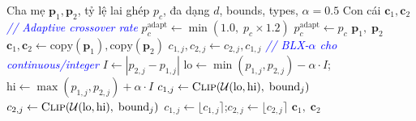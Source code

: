 \documentclass[12pt,a4paper]{article}
\begin{document}
\begin{algorithm}[H]
\caption{Lai ghép BLX-$\alpha$ chi tiết (\textsc{BLXAlphaCrossover})}
\label{alg:ga_crossover}
\begin{algorithmic}[1]
\Require Cha mẹ $\mathbf{p}_1, \mathbf{p}_2$, tỷ lệ lai ghép $p_c$, đa dạng $d$, bounds, types, $\alpha = 0.5$
\Ensure Con cái $\mathbf{c}_1, \mathbf{c}_2$
\Statex \textcolor{blue}{\textit{// Adaptive crossover rate}}
    \State $p_c^{\text{adapt}} \gets \min(1.0,\; p_c \times 1.2)$ 
\Else
    \State $p_c^{\text{adapt}} \gets p_c$
\EndIf
{}
    \State \Return $\mathbf{p}_1,\; \mathbf{p}_2$ 
\EndIf
\State $\mathbf{c}_1, \mathbf{c}_2 \gets \text{copy}(\mathbf{p}_1), \text{copy}(\mathbf{p}_2)$
            \State $c_{1,j}, c_{2,j} \gets c_{2,j}, c_{1,j}$ 
        \EndIf
    \Else
        \Statex \textcolor{blue}{\textit{\quad\quad// BLX-$\alpha$ cho continuous/integer}}
        \State $I \gets |p_{2,j} - p_{1,j}|$
        \State $\text{lo} \gets \min(p_{1,j}, p_{2,j}) - \alpha \cdot I$;\quad $\text{hi} \gets \max(p_{1,j}, p_{2,j}) + \alpha \cdot I$
        \State $c_{1,j} \gets \textsc{Clip}(\mathcal{U}(\text{lo}, \text{hi}),\; \text{bound}_j)$
        \State $c_{2,j} \gets \textsc{Clip}(\mathcal{U}(\text{lo}, \text{hi}),\; \text{bound}_j)$
            \State $c_{1,j} \gets \lfloor c_{1,j} \rceil$;\quad $c_{2,j} \gets \lfloor c_{2,j} \rceil$
        \EndIf
    \EndIf
\EndFor
\State \Return $\mathbf{c}_1,\; \mathbf{c}_2$
\end{algorithmic}
\end{algorithm}
\end{document}
